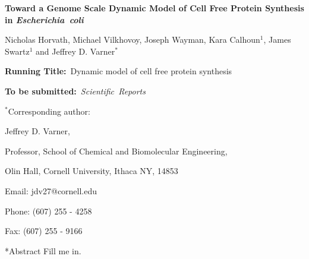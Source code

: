 \documentclass[12pt]{article}
\makeatletter
\renewcommand\section{\@startsection
	{subsection}{2}{0mm}
	{-0.2in}
	{0.05\baselineskip}
	{\normalfont\large\bfseries}}
\makeatother
\begin{document}
\begin{titlepage}
{\par\centering\textbf{\Large {Toward a Genome Scale Dynamic Model of Cell Free Protein Synthesis in \emph{Escherichia~coli}}}}
\vspace{0.05in}
{\par \centering \large{Nicholas Horvath, Michael Vilkhovoy, Joseph Wayman, Kara Calhoun$^{1}$, James Swartz$^{1}$ and Jeffrey D. Varner$^{*}$}}
\vspace{0.10in}
{\par {}}
{\par {}}
\vspace{0.1in}
{\par {}}
{\par {}}
{\par \centering \textbf{Running Title:}~Dynamic model of cell free protein synthesis}
\vspace{0.1in}
{\par \centering \textbf{To be submitted:}~\emph{Scientific~Reports}}
\vspace{0.5in}
{\par \centering $^{*}$Corresponding author:}
{\par \centering Jeffrey D. Varner,}
{\par \centering Professor, School of Chemical and Biomolecular Engineering,}
{\par {} Olin Hall, Cornell University, Ithaca NY, 14853}
{\par \centering Email: jdv27@cornell.edu}
{\par \centering Phone: (607) 255 - 4258}
{\par \centering Fax: (607) 255 - 9166}
\end{titlepage}
\date{}
\thispagestyle{empty}
\pagebreak
\section*{Abstract}
Fill me in.


\end{document}
